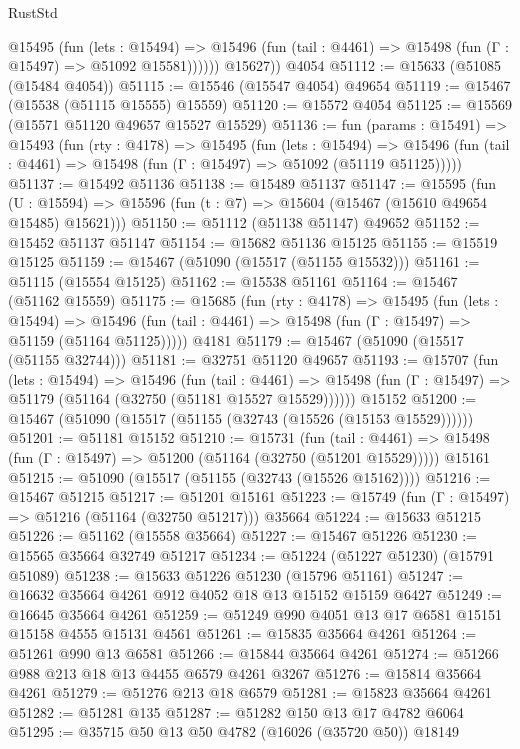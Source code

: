 \begin{lexlean}{RustStd}
\begin{coremodule}
            @15495
              (fun (lets : @15494) =>
              @15496 (fun (tail : @4461) => @15498 (fun (Γ : @15497) => @51092 @15581))))))
        @15627))
    @4054
@51112 := @15633 (@51085 (@15484 @4054))
@51115 := @15546 (@15547 @4054) @49654
@51119 := @15467 (@15538 (@51115 @15555) @15559)
@51120 := @15572 @4054
@51125 := @15569 (@15571 @51120 @49657 @15527 @15529)
@51136 := fun (params : @15491) =>
  @15493
    (fun (rty : @4178) =>
    @15495
      (fun (lets : @15494) =>
      @15496 (fun (tail : @4461) => @15498 (fun (Γ : @15497) => @51092 (@51119 @51125)))))
@51137 := @15492 @51136
@51138 := @15489 @51137
@51147 := @15595
    (fun (U : @15594) => @15596 (fun (t : @7) => @15604 (@15467 (@15610 @49654 @15485) @15621)))
@51150 := @51112 (@51138 @51147) @49652
@51152 := @15452 @51137 @51147
@51154 := @15682 @51136 @15125
@51155 := @15519 @15125
@51159 := @15467 (@51090 (@15517 (@51155 @15532)))
@51161 := @51115 (@15554 @15125)
@51162 := @15538 @51161
@51164 := @15467 (@51162 @15559)
@51175 := @15685
    (fun (rty : @4178) =>
    @15495
      (fun (lets : @15494) =>
      @15496 (fun (tail : @4461) => @15498 (fun (Γ : @15497) => @51159 (@51164 @51125)))))
    @4181
@51179 := @15467 (@51090 (@15517 (@51155 @32744)))
@51181 := @32751 @51120 @49657
@51193 := @15707
    (fun (lets : @15494) =>
    @15496
      (fun (tail : @4461) =>
      @15498 (fun (Γ : @15497) => @51179 (@51164 (@32750 (@51181 @15527 @15529))))))
    @15152
@51200 := @15467 (@51090 (@15517 (@51155 (@32743 (@15526 (@15153 @15529))))))
@51201 := @51181 @15152
@51210 := @15731
    (fun (tail : @4461) => @15498 (fun (Γ : @15497) => @51200 (@51164 (@32750 (@51201 @15529)))))
    @15161
@51215 := @51090 (@15517 (@51155 (@32743 (@15526 @15162))))
@51216 := @15467 @51215
@51217 := @51201 @15161
@51223 := @15749 (fun (Γ : @15497) => @51216 (@51164 (@32750 @51217))) @35664
@51224 := @15633 @51215
@51226 := @51162 (@15558 @35664)
@51227 := @15467 @51226
@51230 := @15565 @35664 @32749 @51217
@51234 := @51224 (@51227 @51230) (@15791 @51089)
@51238 := @15633 @51226 @51230 (@15796 @51161)
@51247 := @16632 @35664 @4261 @912 @4052 @18 @13 @15152 @15159 @6427
@51249 := @16645 @35664 @4261
@51259 := @51249 @990 @4051 @13 @17 @6581 @15151 @15158 @4555 @15131 @4561
@51261 := @15835 @35664 @4261
@51264 := @51261 @990 @13 @6581
@51266 := @15844 @35664 @4261
@51274 := @51266 @988 @213 @18 @13 @4455 @6579 @4261 @3267
@51276 := @15814 @35664 @4261
@51279 := @51276 @213 @18 @6579
@51281 := @15823 @35664 @4261
@51282 := @51281 @135
@51287 := @51282 @150 @13 @17 @4782 @6064
@51295 := @35715 @50 @13 @50 @4782 (@16026 (@35720 @50)) @18149

\end{coremodule}
\end{lexlean}
